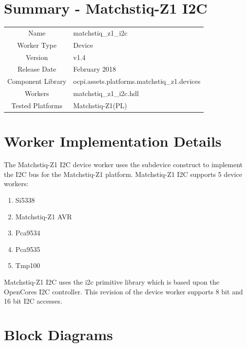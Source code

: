 \documentclass{article}
\author{} %
\date{Version \docVersion} %
\title{\docTitle}
\def\docVersion{1.4}
\def\comp{matchstiq\_z1\_i2c}
\def\Comp{Matchstiq-Z1 I2C}
\begin{document}
\section*{Summary - \Comp}
\begin{tabular}{|c|M{13.5cm}|}
	\hline
	                  &                                        \\
	\hline
	Name              & \comp                                  \\
	\hline
	Worker Type       & Device                                 \\
	\hline
	Version           & v\docVersion \\
	\hline
	Release Date      & February 2018 \\
	\hline
	Component Library & ocpi.assets.platforms.matchstiq\_z1.devices \\
	\hline
	Workers           & \comp.hdl                              \\
	\hline
	Tested Platforms  & Matchstiq-Z1(PL)                       \\
	\hline
\end{tabular}

\section*{Worker Implementation Details}
The Matchstiq-Z1 I2C device worker uses the subdevice construct to implement the I2C bus for the Matchstiq-Z1 platform. Matchstiq-Z1 I2C supports 5 device workers:
\begin{enumerate}
	\item Si5338
	\item Matchstiq-Z1 AVR
	\item Pca9534
	\item Pca9535
	\item Tmp100
\end{enumerate}
Matchstiq-Z1 I2C uses the i2c primitive library which is based upon the OpenCores I2C controller. This revision of the device worker supports 8 bit and 16 bit I2C accesses.

\section*{Block Diagrams}
\end{document}
